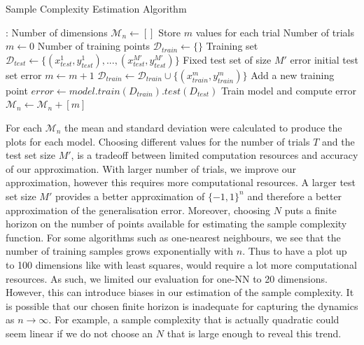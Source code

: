 \documentclass[12pt]{article}
\begin{document}
\begin{itemize}
    \begin{algorithm}
    \caption{Sample Complexity Estimation Algorithm}\label{alg:cap}
    \begin{algorithmic}
    : \Comment Number of dimensions
        \State $\mathcal{M}_n \gets []$ \Comment Store $m$ values for each trial
         \Comment Number of trials
            \State $m \gets  0$ \Comment Number of training points
            \State $\mathcal{D}_{train} \gets  \{\}$ \Comment Training set
            \State $\mathcal{D}_{test} \gets  \{(x^1_{test}, y^1_{test}), ..., (x^{M'}_{test}, y^{M'}_{test})\}$ \Comment Fixed test set of size $M'$
            \State  error  \Comment initial test set error
                \State $m \gets  m+1$
                \State $\mathcal{D}_{train} \gets  \mathcal{D}_{train} \cup \{(x^m_{train}, y^m_{train})\}$ \Comment Add a new training point
                \State $error \gets model.train({D}_{train}).test({D}_{test})$ \Comment Train model and compute error
            \EndWhile
            \State $\mathcal{M}_n \gets \mathcal{M}_n + [m]$
        \EndFor
    \end{algorithmic}
    \end{algorithm}
    For each $\mathcal{M}_n$ the mean and standard deviation were calculated to produce the plots for each model.
    Choosing different values for the number of trials $T$ and the test set size $M'$, is a tradeoff between limited computation resources and accuracy of our approximation. With larger number of trials, we improve our approximation, however this requires more computational resources. A larger test set size $M'$ provides a better approximation of $\{-1 ,1\}^n$ and therefore a better approximation of the generalisation error. Moreover, choosing $N$ puts a finite horizon on the number of points available for estimating the sample complexity function. For some algorithms such as one-nearest neighbours, we see that the number of training samples grows exponentially with $n$. Thus to have a plot up to 100 dimensions like with least squares, would require a lot more computational resources. As such, we limited our evaluation for one-NN to 20 dimensions. However, this can introduce biases in our estimation of the sample complexity. It is possible that our chosen finite horizon is inadequate for capturing the dynamics as $n \rightarrow \infty$. For example, a sample complexity that is actually quadratic could seem linear if we do not choose an $N$ that is large enough to reveal this trend.


\end{itemize}
\end{document}
